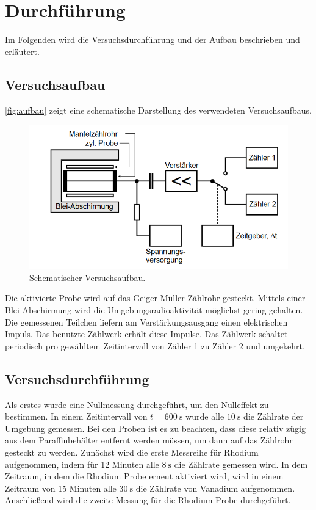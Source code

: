 \section{Durchführung}
\label{sec:durchführung}
Im Folgenden wird die Versuchsdurchführung und der Aufbau beschrieben und erläutert.

\subsection{Versuchsaufbau}
\label{sec:Versuchsaufbau}

\autoref{fig:aufbau} zeigt eine schematische Darstellung des verwendeten Versuchsaufbaus.
\begin{figure}[H]
    \centering
    \includegraphics[width=0.8\linewidth]{content/grafik/aufbau.png}
    \caption{Schematischer Versuchsaufbau.\cite{neutron}}
    \label{fig:aufbau}
\end{figure}

Die aktivierte Probe wird auf das Geiger-Müller Zählrohr gesteckt. Mittels einer Blei-Abschirmung wird die 
Umgebungsradioaktivität möglichst gering gehalten. Die gemessenen Teilchen liefern am Verstärkungsausgang einen elektrischen 
Impuls. Das benutzte Zählwerk erhält diese Impulse. Das Zählwerk schaltet periodisch pro gewähltem Zeitintervall
von Zähler 1 zu Zähler 2  und umgekehrt.

\subsection{Versuchsdurchführung}
\label{sec:Versuchsdurchführung}

Als erstes wurde eine Nullmessung durchgeführt, um den Nulleffekt zu bestimmen. In einem Zeitintervall von $t = \SI{600}{\second}$
wurde alle $\SI{10}{\second}$ die Zählrate der Umgebung gemessen.
Bei den Proben ist es zu beachten, dass diese relativ zügig aus dem Paraffinbehälter entfernt werden müssen, um dann auf 
das Zählrohr gesteckt zu werden. Zunächst wird die erste Messreihe für Rhodium aufgenommen, indem für 12 Minuten alle $\SI{8}{\second}$
die Zählrate gemessen wird. In dem Zeitraum, in dem die Rhodium Probe erneut aktiviert wird, wird in einem Zeitraum von 15 Minuten
alle $\SI{30}{\second}$ die Zählrate von Vanadium aufgenommen. Anschließend wird die zweite Messung für die Rhodium Probe durchgeführt.
